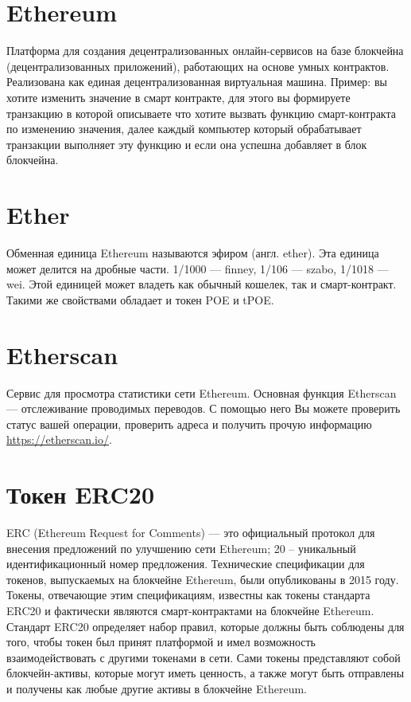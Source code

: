\documentclass[a4paper,12pt]{report}
\begin{document}
\section{Ethereum}
Платформа для создания децентрализованных онлайн-сервисов на базе блокчейна (децентрализованных приложений), работающих на основе умных контрактов. Реализована как единая децентрализованная виртуальная машина. Пример: вы хотите изменить значение в смарт контракте, для этого вы формируете транзакцию в которой описываете что хотите вызвать функцию смарт-контракта по изменению значения, далее каждый компьютер который обрабатывает транзакции выполняет эту функцию и если она успешна добавляет в блок блокчейна.

\section{Ether}
Обменная единица Ethereum называются эфиром (англ. ether). Эта единица может делится на дробные части. 1/1000 — finney, 1/106 — szabo, 1/1018 — wei. Этой единицей может владеть как обычный кошелек, так и смарт-контракт. Такими же свойствами обладает и токен POE и tPOE.

\section{Etherscan}
Сервис для просмотра статистики сети Ethereum. Основная функция Etherscan — отслеживание проводимых переводов. С помощью него Вы можете проверить статус вашей операции, проверить адреса и получить прочую информацию  \href{https://etherscan.io/}{https://etherscan.io/}.


\section{Токен ERC20}
ERC (Ethereum Request for Comments) — это официальный протокол для внесения предложений по улучшению сети Ethereum; 20 – уникальный идентификационный номер предложения. Технические спецификации для токенов, выпускаемых на блокчейне Ethereum, были опубликованы в 2015 году. Токены, отвечающие этим спецификациям, известны как токены стандарта ERC20 и фактически являются смарт-контрактами на блокчейне Ethereum. Стандарт ERC20 определяет набор правил, которые должны быть
соблюдены для того, чтобы токен был принят платформой и имел возможность взаимодействовать с другими токенами в сети. Сами токены представляют собой блокчейн-активы, которые могут иметь ценность, а также могут быть отправлены и получены как любые другие активы в блокчейне Ethereum. 
\end{document}
